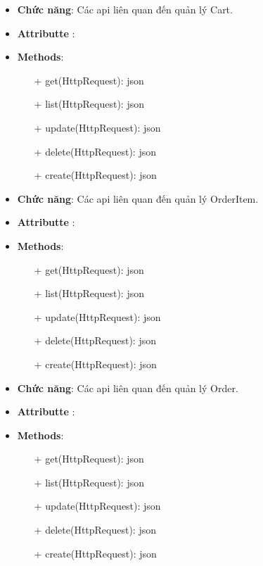 \begin{itemize}
    \item \textbf{Chức năng}: Các api liên quan đến quản lý Cart.
    \item \textbf{Attributte} :
    \item \textbf{Methods}:
    \begin{itemize}
        \item[+] get(HttpRequest): json
        \item[+] list(HttpRequest): json
        \item[+] update(HttpRequest): json
        \item[+] delete(HttpRequest): json
        \item[+] create(HttpRequest): json
    \end{itemize}
\end{itemize}
\begin{itemize}
    \item \textbf{Chức năng}: Các api liên quan đến quản lý OrderItem.
    \item \textbf{Attributte} :
    \item \textbf{Methods}:
    \begin{itemize}
        \item[+] get(HttpRequest): json
        \item[+] list(HttpRequest): json
        \item[+] update(HttpRequest): json
        \item[+] delete(HttpRequest): json
        \item[+] create(HttpRequest): json
    \end{itemize}
\end{itemize}
\begin{itemize}
    \item \textbf{Chức năng}: Các api liên quan đến quản lý Order.
    \item \textbf{Attributte} :
    \item \textbf{Methods}:
    \begin{itemize}
        \item[+] get(HttpRequest): json
        \item[+] list(HttpRequest): json
        \item[+] update(HttpRequest): json
        \item[+] delete(HttpRequest): json
        \item[+] create(HttpRequest): json
    \end{itemize}
\end{itemize}
